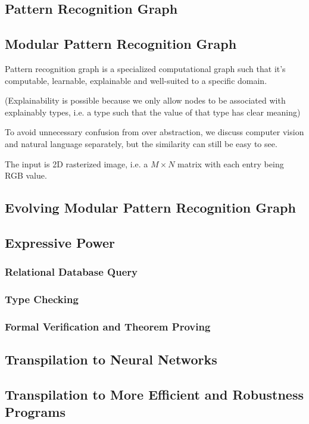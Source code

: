 \documentclass[../main.tex]{subfiles}
\begin{document}
\subsection{Pattern Recognition Graph}

\subsection{Modular Pattern Recognition Graph}

Pattern recognition graph is a specialized computational graph such that it's computable, learnable, explainable and well-suited to a specific domain.

(Explainability is possible because we only allow nodes to be associated with explainably types, i.e. a type such that the value of that type has clear meaning)

To avoid unnecessary confusion from over abstraction, we discuss computer vision and natural language separately, but the similarity can still be easy to see.

\begin{defn}
	The input is 2D rasterized image, i.e. a $M\times N$ matrix with each entry being RGB value.
\end{defn}

\subsection{Evolving Modular Pattern Recognition Graph}

\subsection {Expressive Power}

\subsubsection{Relational Database Query}


\subsubsection{Type Checking}

\subsubsection{Formal Verification and Theorem Proving}

\subsection{Transpilation to Neural Networks}

\subsection{Transpilation to More Efficient and Robustness Programs}
\end{document}
